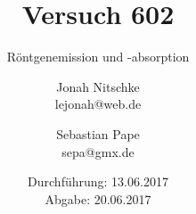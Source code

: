 

\title{Versuch 602}
\subtitle{Röntgenemission und -absorption}
\author{Jonah Nitschke\\
        lejonah@web.de \and
        Sebastian Pape\\
        sepa@gmx.de}
\date{Durchführung: 13.06.2017\\
      Abgabe: 20.06.2017}



\maketitle
\newpage
\setcounter{page}{1}


\newpage


\printbibliography


